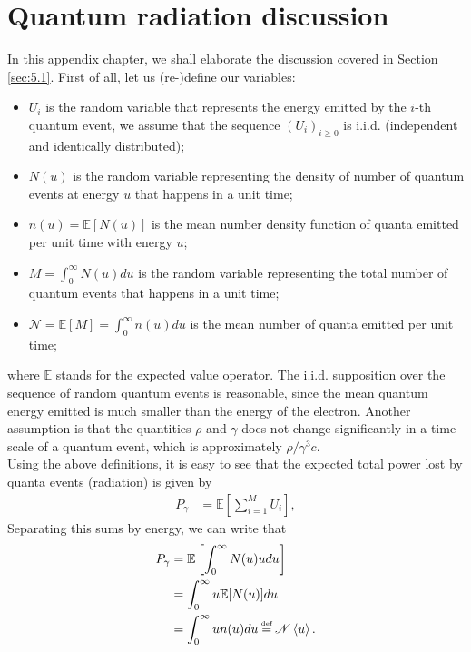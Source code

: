 \documentclass[../sands-adaptation.tex]{subfiles}
\begin{document}
\section{Quantum radiation discussion} \label{sec:QuantumRadiation}

In this appendix chapter, we shall elaborate the discussion covered in Section \ref{sec:5.1}. First of all, let us (re-)define our variables:
\begin{itemize}
\item $U_i$ is the random variable that represents the energy emitted by the $i$-th quantum event, we assume that the sequence $(U_i)_{i\geq0}$ is i.i.d. (independent and identically distributed);
\item $N(u)$ is the random variable representing the density of number of quantum events at energy $u$ that happens in a unit time;
\item $n(u) = \mathbb{E}[N(u)]$ is the mean number density function of quanta emitted per unit time with energy $u$;
\item $M = \int_0^\infty N(u)du$ is the random variable representing the total number of quantum events that happens in a unit time;
\item $\mathscr{N} = \mathbb{E}[M] = \int_0^\infty n(u) du$ is the mean number of quanta emitted per unit time;
\end{itemize}
where $\mathbb{E}$ stands for the expected value operator. The i.i.d. supposition over the sequence of random quantum events is reasonable, since the mean quantum energy emitted is much smaller than the energy of the electron. Another assumption is that the quantities $\rho$ and $\gamma$ does not change significantly in a  time-scale of a quantum event, which is approximately $\rho/\gamma^3 c$. \\
Using the above definitions, it is easy to see that the expected total power lost by quanta events (radiation) is given by
\begin{align}
	P_\gamma &= \mathbb{E}\left[ \sum_{i=1}^{M} U_i \right],
\end{align}
Separating this sums by energy, we can write that
\begin{align*}
	P_\gamma &= \mathbb{E}\left[ \int_0^\infty N(u) u du \right]\\
    		&= \int_0^\infty u \mathbb{E}[N(u)] du\\
            &= \int_0^\infty u n(u) du \bydef \mathscr{N} \mean{u}.
\end{align*}
\end{document}
